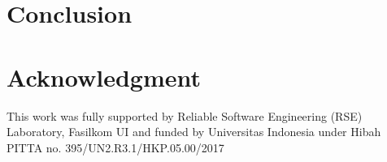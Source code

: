 \documentclass[conference]{IEEEtran}
\begin{document}
\section{Conclusion}


\section*{Acknowledgment}
This work was fully supported by Reliable Software Engineering (RSE) Laboratory, Fasilkom UI and funded by Universitas Indonesia under Hibah PITTA no. 395/UN2.R3.1/HKP.05.00/2017




\end{document}

